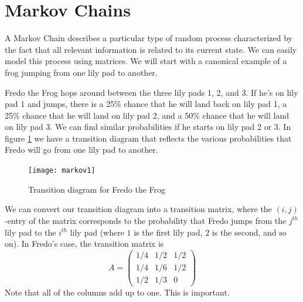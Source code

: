 \label{lab:MarkovGraph}


\section*{Markov Chains}


A Markov Chain describes a particular type of random process characterized by the fact that all relevant information is related to its current state.
We can easily model this process using matrices.
We will start with a canonical example of a frog jumping from one lily pad to another.

Fredo the Frog hops around between the three lily pads 1, 2, and 3.
If he's on lily pad 1 and jumps, there is a 25\% chance that he will land back on lily pad 1, a 25\% chance that he will land on lily pad 2, and a 50\% chance that he will land on lily pad 3.
We can find similar probabilities if he starts on lily pad 2 or 3.
In figure \ref{markov1} we have a transition diagram that reflects the various probabilities that Fredo will go from one lily pad to another.

\begin{figure}[h!]
\begin{center}
\texttt{[image: markov1]}
\end{center}
\caption{Transition diagram for Fredo the Frog}
\label{markov1}
\end{figure}

We can convert our transition diagram into a transition matrix, where the $(i,j)$-entry of the matrix corresponds to the probability that Fredo jumps from the $j^{th}$ lily pad to the $i^{th}$ lily pad (where $1$ is the first lily pad, $2$ is the second, and so on).
In Fredo's case, the transition matrix is
\[
A = \begin{pmatrix}
1/4 & 1/2 & 1/2\\
1/4 & 1/6 & 1/2\\
1/2 & 1/3 & 0
\end{pmatrix}
\]
Note that all of the columns add up to one.
This is important. %

